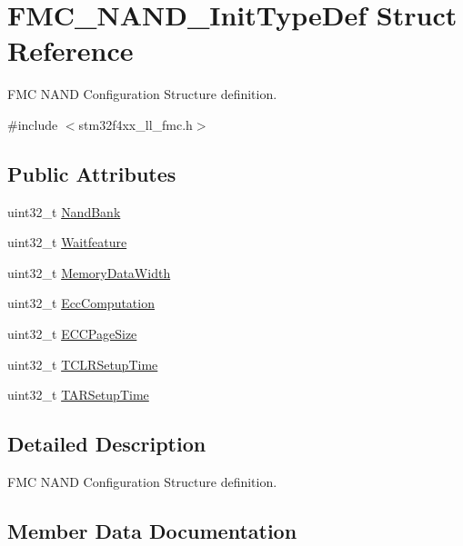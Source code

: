 \hypertarget{struct_f_m_c___n_a_n_d___init_type_def}{}\section{F\+M\+C\+\_\+\+N\+A\+N\+D\+\_\+\+Init\+Type\+Def Struct Reference}
\label{struct_f_m_c___n_a_n_d___init_type_def}


F\+MC N\+A\+ND Configuration Structure definition.  




{\ttfamily \#include $<$stm32f4xx\+\_\+ll\+\_\+fmc.\+h$>$}

\subsection*{Public Attributes}
\begin{DoxyCompactItemize}
\item 
uint32\+\_\+t \hyperlink{struct_f_m_c___n_a_n_d___init_type_def_ade342163a8ca0ad3651cc870b3368d6c}{Nand\+Bank}
\item 
uint32\+\_\+t \hyperlink{struct_f_m_c___n_a_n_d___init_type_def_af32f615ad4a0715b2eb29376480f06e6}{Waitfeature}
\item 
uint32\+\_\+t \hyperlink{struct_f_m_c___n_a_n_d___init_type_def_afba56d09ca367a400126147a86ccda2e}{Memory\+Data\+Width}
\item 
uint32\+\_\+t \hyperlink{struct_f_m_c___n_a_n_d___init_type_def_ad335b69985dfaba63645e4eedb12dceb}{Ecc\+Computation}
\item 
uint32\+\_\+t \hyperlink{struct_f_m_c___n_a_n_d___init_type_def_ad1f82ad7a61b76489541c17868e7544b}{E\+C\+C\+Page\+Size}
\item 
uint32\+\_\+t \hyperlink{struct_f_m_c___n_a_n_d___init_type_def_a92b101e748404ea12ea1f83456108129}{T\+C\+L\+R\+Setup\+Time}
\item 
uint32\+\_\+t \hyperlink{struct_f_m_c___n_a_n_d___init_type_def_a9bc5349964a50606c1ce4da4931b21d7}{T\+A\+R\+Setup\+Time}
\end{DoxyCompactItemize}


\subsection{Detailed Description}
F\+MC N\+A\+ND Configuration Structure definition. 

\subsection{Member Data Documentation}
